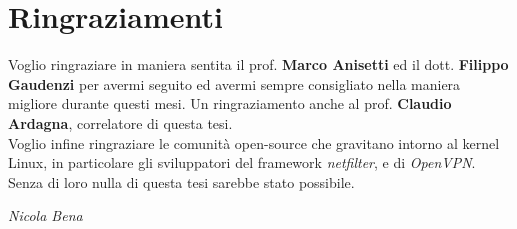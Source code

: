 \chapter*{Ringraziamenti}

Voglio ringraziare in maniera sentita il prof. \textbf{Marco Anisetti} ed il
dott. \textbf{Filippo Gaudenzi} per avermi seguito ed avermi sempre consigliato nella
maniera migliore durante questi mesi. Un ringraziamento anche al prof. \textbf{Claudio Ardagna},
correlatore di questa tesi.\\
Voglio infine ringraziare le comunità open-source che gravitano intorno al kernel Linux, in
particolare gli sviluppatori del framework \textit{netfilter}, e di \textit{OpenVPN}. Senza
di loro nulla di questa tesi sarebbe stato possibile.


\begin{flushright}
    \textit{Nicola Bena}
\end{flushright}